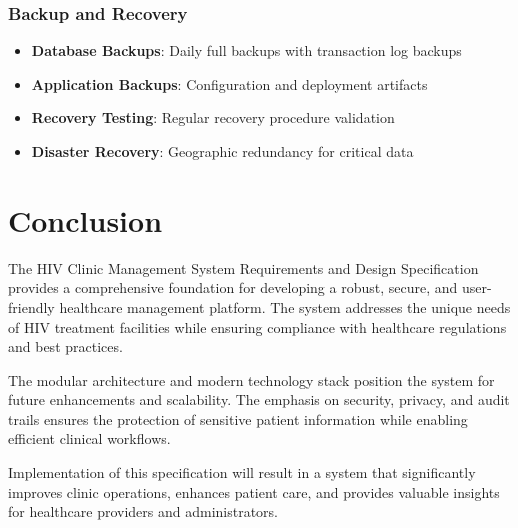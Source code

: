 \documentclass[12pt,a4paper]{article}
\begin{document}
\subsubsection{Backup and Recovery}
\begin{itemize}
    \item \textbf{Database Backups}: Daily full backups with transaction log backups
    \item \textbf{Application Backups}: Configuration and deployment artifacts
    \item \textbf{Recovery Testing}: Regular recovery procedure validation
    \item \textbf{Disaster Recovery}: Geographic redundancy for critical data
\end{itemize}

\section{Conclusion}

The HIV Clinic Management System Requirements and Design Specification provides a comprehensive foundation for developing a robust, secure, and user-friendly healthcare management platform. The system addresses the unique needs of HIV treatment facilities while ensuring compliance with healthcare regulations and best practices.

The modular architecture and modern technology stack position the system for future enhancements and scalability. The emphasis on security, privacy, and audit trails ensures the protection of sensitive patient information while enabling efficient clinical workflows.

Implementation of this specification will result in a system that significantly improves clinic operations, enhances patient care, and provides valuable insights for healthcare providers and administrators.
\end{document}
